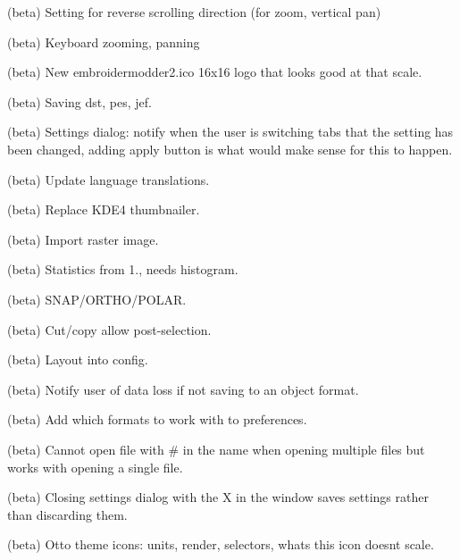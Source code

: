 \begin{DoxyRefList}
\label{todo__todo000139}%
%
(beta) Setting for reverse scrolling direction (for zoom, vertical pan)

\label{todo__todo000140}%
%
(beta) Keyboard zooming, panning

\label{todo__todo000141}%
%
(beta) New embroidermodder2.\+ico 16x16 logo that looks good at that scale.

\label{todo__todo000142}%
%
(beta) Saving dst, pes, jef.

\label{todo__todo000143}%
%
(beta) Settings dialog\+: notify when the user is switching tabs that the setting has been changed, adding apply button is what would make sense for this to happen.

\label{todo__todo000144}%
%
(beta) Update language translations.

\label{todo__todo000145}%
%
(beta) Replace KDE4 thumbnailer.

\label{todo__todo000146}%
%
(beta) Import raster image.

\label{todo__todo000147}%
%
(beta) Statistics from 1., needs histogram.

\label{todo__todo000148}%
%
(beta) SNAP/\+ORTHO/\+POLAR.

\label{todo__todo000149}%
%
(beta) Cut/copy allow post-\/selection.

\label{todo__todo000150}%
%
(beta) Layout into config.

\label{todo__todo000151}%
%
(beta) Notify user of data loss if not saving to an object format.

\label{todo__todo000152}%
%
(beta) Add which formats to work with to preferences.

\label{todo__todo000153}%
%
(beta) Cannot open file with {\ttfamily \#} in the name when opening multiple files but works with opening a single file.

\label{todo__todo000154}%
%
(beta) Closing settings dialog with the X in the window saves settings rather than discarding them.

\label{todo__todo000155}%
%
(beta) Otto theme icons\+: units, render, selectors, what\textquotesingle{}s this icon doesn\textquotesingle{}t scale.


\end{DoxyRefList}
